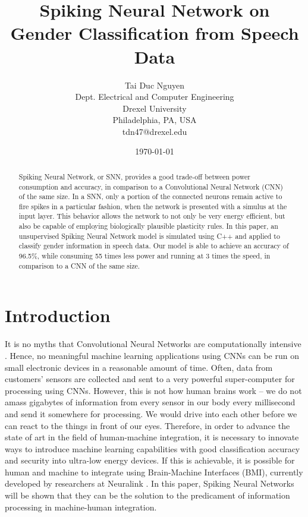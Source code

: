 \documentclass[11pt]{article}  %
\title{Spiking Neural Network on \\ Gender Classification from Speech Data}
\author{
	Tai Duc Nguyen \\
	Dept. Electrical and Computer Engineering \\
	Drexel University \\
	Philadelphia, PA, USA \\
	tdn47@drexel.edu
}
\date{\today}
\begin{document}
\maketitle

\begin{abstract}
	Spiking Neural Network, or SNN, provides a good trade-off between power consumption and accuracy, in comparison to a Convolutional Neural Network (CNN) of the same size. In a SNN, only a portion of the connected neurons remain active to fire spikes in a particular fashion, when the network is presented with a simulus at the input layer. This behavior allows the network to not only be very energy efficient, but also be capable of employing biologically plausible plasticity rules. In this paper, an unsupervised Spiking Neural Network model is simulated using C++ and applied to classify gender information in speech data. Our model is able to achieve an accuracy of 96.5\%, while consuming 55 times less power and running at 3 times the speed, in comparison to a CNN of the same size.
\end{abstract}

\section{Introduction}
\label{intro}

It is no myths that Convolutional Neural Networks are computationally intensive \cite{b1}. Hence, no meaningful machine learning applications using CNNs can be run on small electronic devices in a reasonable amount of time. Often, data from customers' sensors are collected and sent to a very powerful super-computer for processing using CNNs. However, this is not how human brains work -- we do not amass gigabytes of information from every sensor in our body every millisecond and send it somewhere for processing. We would drive into each other before we can react to the things in front of our eyes. Therefore, in order to advance the state of art in the field of human-machine integration, it is necessary to innovate ways to introduce machine learning capabilities with good classification accuracy and security into ultra-low energy devices. If this is achievable, it is possible for human and machine to integrate using Brain-Machine Interfaces (BMI), currently developed by researchers at Neuralink \cite{b2}. In this paper, Spiking Neural Networks will be shown that they can be the solution to the predicament of information processing in machine-human integration. 
\end{document}
